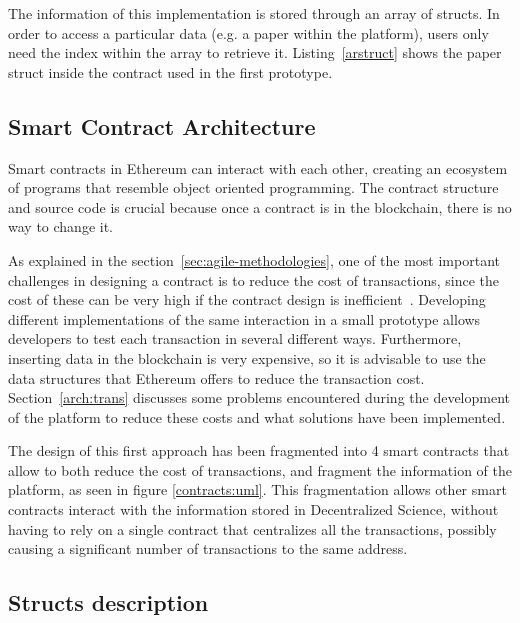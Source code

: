 The information of this implementation is stored through an array of structs. In
order to access a particular data (e.g. a paper within the platform), users only
need the index within the array to retrieve it. Listing~\ref{arstruct} shows the
paper struct inside the  contract used in the first prototype.



\subsection*{Smart Contract Architecture}
\label{arch:sca}

Smart contracts in Ethereum can interact with each other, creating an ecosystem
of programs that resemble object oriented programming. The contract structure
and source code is crucial because once a contract is in the blockchain, there
is no way to change it.

As explained in the section~\ref{sec:agile-methodologies}, one of the most
important challenges in designing a contract is to reduce the cost of
transactions, since the cost of these can be very high if the contract design is
inefficient~\cite{croman2016scaling}. Developing different implementations of
the same interaction in a small prototype allows developers to test each
transaction in several different ways. Furthermore, inserting data in the
blockchain is very expensive, so it is advisable to use the data structures that
Ethereum offers to reduce the transaction cost. Section~\ref{arch:trans}
discusses some problems encountered during the development of the platform to
reduce these costs and what solutions have been implemented.


The design of this first approach has been fragmented into 4 smart contracts
that allow to both reduce the cost of transactions, and fragment the information
of the platform, as seen in figure \ref{contracts:uml}. This fragmentation
allows other smart contracts interact with the information stored in
Decentralized Science, without having to rely on a single contract that
centralizes all the transactions, possibly causing a significant number of
transactions to the same address.

\subsection*{Structs description}
\label{sec:structs-impl-contr}


